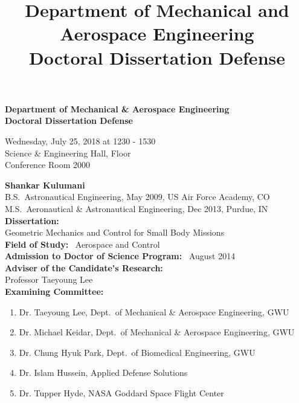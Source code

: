 \documentclass[letterpaper]{article}
\title{Department of Mechanical and Aerospace Engineering\\
Doctoral Dissertation Defense}
\date{}
\begin{document}
\thispagestyle{empty}
\begin{center}
    \textbf{\large
    Department of Mechanical \& Aerospace Engineering\\
    Doctoral Dissertation Defense
}
\end{center}

\begin{flushright}
    Wednesday, July 25, 2018 at 1230 - 1530\\
    Science \& Engineering Hall,  Floor\\
    Conference Room 2000
\end{flushright}

\noindent \textbf{Shankar Kulumani}\\

\noindent B.S.\ Astronautical Engineering, May 2009, US Air Force Academy, CO\\
\noindent M.S.\ Aeronautical \& Astronautical Engineering, Dec 2013, Purdue, IN\\

\noindent \textbf{Dissertation:}\\

\noindent Geometric Mechanics and Control for Small Body Missions\\

\noindent \textbf{Field of Study:} \, Aerospace and Control\\

\noindent \textbf{Admission to Doctor of Science Program:} \, August 2014\\

\noindent \textbf{Adviser of the Candidate's Research:}\\

Professor Taeyoung Lee\\

\noindent \textbf{Examining Committee:}

\begin{enumerate}
    \item Dr. Taeyoung Lee, Dept.\ of Mechanical \& Aerospace Engineering, GWU
    \item Dr. Michael Keidar, Dept.\ of Mechanical \& Aerospace Engineering, GWU
    \item Dr. Chung Hyuk Park, Dept.\ of Biomedical Engineering, GWU
    \item Dr. Islam Hussein, Applied Defense Solutions
    \item Dr. Tupper Hyde, NASA Goddard Space Flight Center
\end{enumerate}
\end{document}
